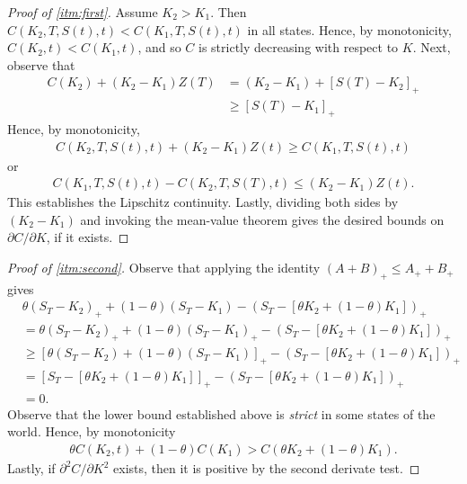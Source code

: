 \documentclass[12pt]{article}
\newcommand{\p}{\partial}
\theoremstyle{plain}
\theoremstyle{definition}
\theoremstyle{remark}
\numberwithin{equation}{section}  %
\begin{document}
\begin{proof}[Proof of \cref{itm:first}]
	Assume $K_{2} > K_{1}$. Then $C(K_{2}, T, S(t), t) < C(K_{1}, T, S(t), t)$
	in all states. Hence, by monotonicity, $C(K_{2}, t) < C(K_{1}, t)$, and so
	$C$ is  strictly decreasing with respect to $K$. Next, observe that
	\begin{equation*}
		\begin{split}
			C(K_{2}) + (K_{2} - K_{1})Z(T)
			& = (K_{2} - K_{1}) + {[S(T) - K_{2}]}_{+}
			\\
			& 
			\ge {[S(T) - K_{1}]}_{+}
		\end{split}
	\end{equation*}
	Hence, by monotonicity,
	\begin{equation*}
		\begin{split}
			C(K_{2}, T, S(t), t) + (K_{2} - K_{1})Z(t) \ge C(K_{1}, T, S(t), t)
		\end{split}
	\end{equation*}
	or
	\begin{equation*}
		\begin{split}
			C(K_{1}, T, S(t), t) - C(K_{2}, T, S(T), t) \le (K_{2} - K_{1})Z(t).
		\end{split}
	\end{equation*}
	This establishes the Lipschitz continuity. Lastly, dividing both sides by 
	$(K_{2} - K_{1})$ and invoking the mean-value theorem
	gives the desired bounds on $\p C/ \p K$, if it exists.
\end{proof}
\begin{proof}[Proof of \cref{itm:second}]
	Observe that applying the identity ${(A + B)}_{+} \le A_{+} + B_{+}$
	gives
	\begin{equation*}
		\begin{split}
			& \theta{(S_{T} - K_{2})}_{+} + (1 - \theta)(S_{T} - K_{1})
			- {(S_{T} - [\theta K_{2} + (1 - \theta)K_{1}])}_{+}
			\\
			& = \theta{(S_{T} - K_{2})}_{+} + (1 - \theta){(S_{T} - K_{1})}_{+}
			- {\left( S_{T} - [\theta K_{2} + (1 - \theta)K_{1}] \right)}_{+}
			\\
			& \ge {[\theta(S_{T} - K_{2}) + (1 - \theta)(S_{T} - K_{1})]}_{+}
			- {\left( S_{T} - \left[ \theta K_{2} + (1 - \theta)K_{1} \right]
			\right)}_{+}
			\\
			& = {\left[ S_{T} - [\theta K_{2} + (1 - \theta)K_{1}] \right]}_{+}
			- {\left( S_{T} - \left[ \theta K_{2} + (1 - \theta)K_{1} \right]
			\right)}_{+}
			\\
			& = 0.
		\end{split}
	\end{equation*}
	Observe that the lower bound established above is \emph{strict}
	in some states of the world. Hence, by monotonicity
	\begin{equation*}
		\begin{split}
			\theta C(K_{2}, t) + (1 - \theta)C(K_{1}) > C(\theta K_{2} + (1 -
			\theta)K_{1}).
		\end{split}
	\end{equation*}
	Lastly, if $\p^2 C/ \p K^2$ exists, then it is positive by the second
	derivate test.
\end{proof}
\end{document}

